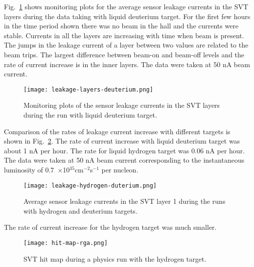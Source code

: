Fig.~\ref{fig:leakage-layers-deuterium} shows monitoring plots for the average sensor leakage currents in the SVT layers during the data taking with liquid deuterium target. For the first few hours in the time period shown there was no beam in the hall and the currents were stable. Currents in all the layers are increasing with time when beam is present. The jumps in the leakage current of a layer between two values are related to the beam trips. The largest difference between beam-on and beam-off levels and the rate of current increase is in the inner layers. The data were taken at 50 nA beam current. 

\begin{figure}[hbt] 
\centering 
\texttt{[image: leakage-layers-deuterium.png]}
\caption{Monitoring plots of the sensor leakage currents in the SVT layers during the run with liquid deuterium target.}
\label{fig:leakage-layers-deuterium}
\end{figure}

Comparison of the rates of leakage current increase with different targets is shown in Fig.~\ref{fig:leakage-hydrogen-duterium}. The rate of current increase with liquid deuterium target was about 1 nA per hour. The rate for liquid hydrogen target was 0.06 nA per hour. The data were taken at 50 nA beam current corresponding to the instantaneous luminosity of 0.7~$\times$10$^{35}$cm$^{-2}$s$^{-1}$ per nucleon.

\begin{figure}[hbt] 
\centering 
\texttt{[image: leakage-hydrogen-duterium.png]}
\caption{Average sensor leakage currents in the SVT layer 1 during the runs with hydrogen and deuterium targets.}
\label{fig:leakage-hydrogen-duterium}
\end{figure}

The rate of current increase for the hydrogen target was much smaller.
\begin{figure}[hbt] 
\centering 
\texttt{[image: hit-map-rga.png]}
\caption{SVT hit map during a physics run with the hydrogen target.}
\label{fig:hit-map-rga}
\end{figure}

